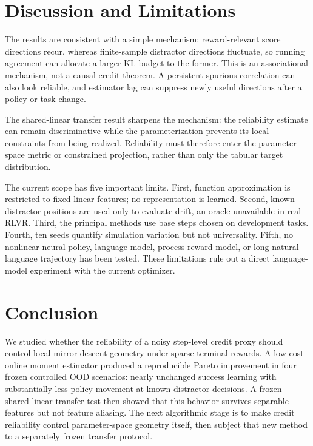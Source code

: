 \documentclass[10pt]{article}
\begin{document}
\section{Discussion and Limitations}

The results are consistent with a simple mechanism: reward-relevant score
directions recur, whereas finite-sample distractor directions fluctuate, so
running agreement can allocate a larger KL budget to the former.  This is an
associational mechanism, not a causal-credit theorem.  A persistent spurious
correlation can also look reliable, and estimator lag can suppress newly useful
directions after a policy or task change.

The shared-linear transfer result sharpens the mechanism: the reliability
estimate can remain discriminative while the parameterization prevents its
local constraints from being realized.  Reliability must therefore enter the
parameter-space metric or constrained projection, rather than only the tabular
target distribution.

The current scope has five important limits.  First, function approximation is
restricted to fixed linear features; no representation is learned.  Second, known
distractor positions are used only to evaluate drift, an oracle unavailable in
real RLVR.  Third, the principal methods use base steps chosen on development
tasks.  Fourth, ten seeds quantify simulation variation but not universality.
Fifth, no nonlinear neural policy, language model, process reward model, or long
natural-language trajectory has been tested.  These limitations rule out a
direct language-model experiment with the current optimizer.

\section{Conclusion}

We studied whether the reliability of a noisy step-level credit proxy should
control local mirror-descent geometry under sparse terminal rewards.  A
low-cost online moment estimator produced a reproducible Pareto improvement in
four frozen controlled OOD scenarios: nearly unchanged success learning with
substantially less policy movement at known distractor decisions.  A frozen
shared-linear transfer test then showed that this behavior survives separable
features but not feature aliasing.  The next algorithmic stage is to make credit
reliability control parameter-space geometry itself, then subject that new
method to a separately frozen transfer protocol.
\end{document}
